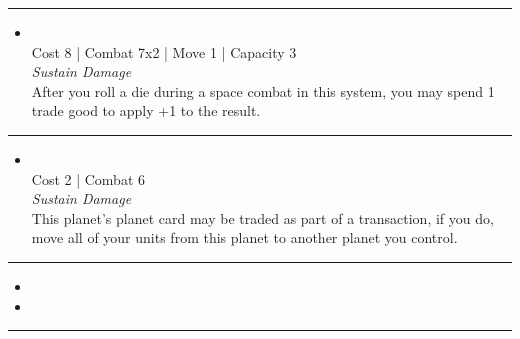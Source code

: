 \begin{multicols}{2}
\vspace{-10pt}\rule{\hsize}{0.4pt}\vspace{5pt}


\begin{itemize}
\item {}\\
Cost 8 | Combat 7x2 | Move 1 | Capacity 3 \\
\emph{Sustain Damage}\\
After you roll a die during a space combat in this system, you may spend 1 trade good to apply +1 to the result.
\end{itemize}

\vspace{-10pt}\rule{\hsize}{0.4pt}\vspace{5pt}


\begin{itemize}
\item {}
\\
Cost 2 | Combat 6 \\
\emph{Sustain Damage}\\
This planet’s planet card may be traded as part of a transaction, if you do, move all of your units from this planet to another planet you control.
\end{itemize}

\vspace{-10pt}\rule{\hsize}{0.4pt}\vspace{5pt}

\nounits

\columnbreak
{}

\begin{itemize}
\item \biomes
\item \datahub
\end{itemize}

\vspace{-10pt}\rule{\hsize}{0.4pt}\vspace{5pt}



\end{multicols}
